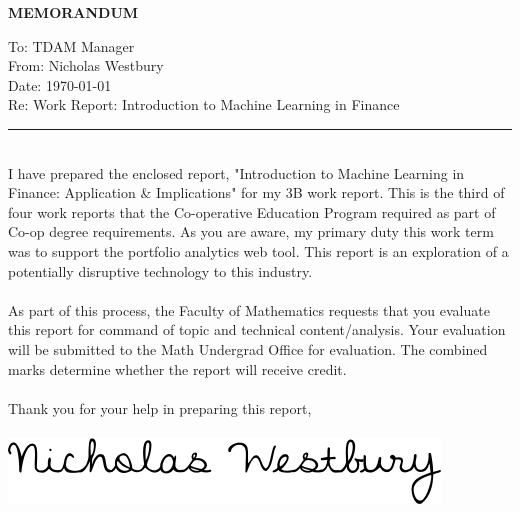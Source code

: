 \documentclass[12pt]{report}
\newcommand{\HRule}[1]{\rule{\linewidth}{#1}}
\begin{document}
\newpage\noindent\thispagestyle{empty}
\LARGE\textbf{\uppercase{MEMORANDUM}} \normalsize
\vspace*{-10px}
\begin{singlespacing}\noindent
\vspace*{-10px}
To: TDAM Manager\\
\vspace*{-10px}
From: Nicholas Westbury\\
\vspace*{-10px}
Date: \today\\
\vspace*{-10px}
Re: Work Report: Introduction to Machine Learning in Finance \\
\end{singlespacing}
\HRule{1.5pt}\\
I have prepared the enclosed report, "Introduction to Machine Learning in Finance: Application \& Implications" for my 3B work report. This is the third of four work reports that the Co-operative Education Program required as part of Co-op degree requirements. As you are aware, my primary duty this work term was to support the portfolio analytics web tool. This report is an exploration of a potentially disruptive technology to this industry.\\ \\ \noindent
As part of this process, the Faculty of Mathematics requests that you evaluate this report for command of topic and technical content/analysis. Your evaluation will be submitted to the Math Undergrad Office for evaluation. The combined marks determine whether the report will receive credit. \\ \\
Thank you for your help in preparing this report,\\ \\ \noindent
\includegraphics[scale=0.55]{signature}

\newpage\thispagestyle{fancy}\sectionfont{\scshape}
\end{document}
